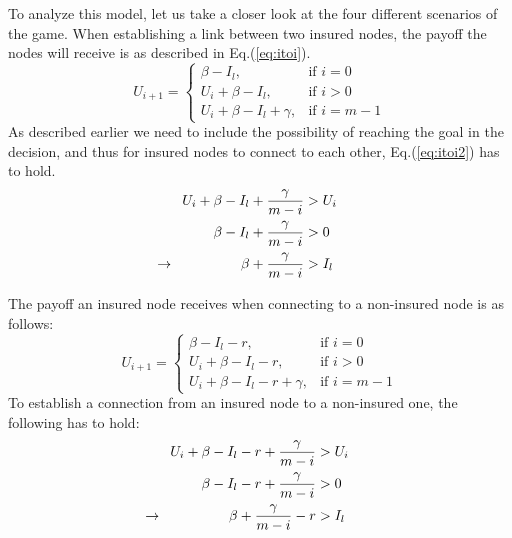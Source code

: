 To analyze this model, let us take a closer look at the four different scenarios of the game. When establishing a link between two insured nodes, the payoff the nodes will receive is as described in Eq.(\ref{eq:itoi}).
\begin{equation}
    U_{i+1}= 
\begin{cases}
    \beta - I_{l},& \text{if } i = 0\\
    U_{i}+\beta -I_{l},& \text{if }  i>0\\
    U_{i}+\beta -I_{l}+\gamma,& \text{if } i=m-1
    
\end{cases}
\label{eq:itoi}
\end{equation}
As described earlier we need to include the possibility of reaching the goal in the decision, and thus for insured nodes to connect to each other, Eq.(\ref{eq:itoi2}) has to hold.
\begin{eqnarray}
U_{i}+\beta-I_{l}+\frac{\gamma}{m-i}&>U_{i} \nonumber \\ 
\beta-I_{l}+\frac{\gamma}{m-i}&>0 \nonumber \\ 
\llap{$\rightarrow$\hspace{50pt}} \beta+\frac{\gamma}{m-i}&>I_{l} 
\label{eq:itoi2}
\end{eqnarray}

The payoff an insured node receives when connecting to a non-insured node is as follows:
\begin{equation}
    U_{i+1}= 
\begin{cases}
    \beta  - I_{l} -r,& \text{if } i = 0\\
    U_{i}+\beta -I_{l}-r,& \text{if }  i>0\\
    U_{i}+\beta -I_{l}-r+\gamma,& \text{if } i=m-1
\end{cases}
\label{eq:itonoti}
\end{equation}
To establish a connection from an insured node to a non-insured one, the following has to hold:
\begin{eqnarray}
U_{i}+\beta-I_{l}-r+\frac{\gamma}{m-i}&>U_{i} \nonumber \\ 
\beta-I_{l}-r+\frac{\gamma}{m-i}&>0 \nonumber \\ 
\llap{$\rightarrow$\hspace{50pt}} \beta+\frac{\gamma}{m-i}-r&>I_{l} 
\end{eqnarray}

